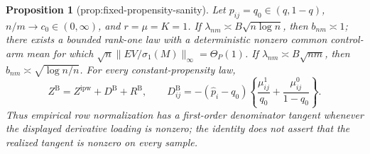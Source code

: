 \documentclass{article}
\newtheorem{proposition}{Proposition}
\begin{document}
\begin{proposition}[prop:fixed-propensity-sanity]\label{prop:fixed-propensity-sanity}
Let \(p_{ij}=q_0\in(q,1-q)\), \(n/m\to c_0\in(0,\infty)\), and \(r=\mu=K=1\).  If \(\lambda_{nm}\asymp B\sqrt{n\log n}\), then \(b_{nm}\asymp1\); there exists a bounded rank-one law with a deterministic nonzero common control-arm mean for which \(\sqrt n\lVert EV/\sigma_1(M)\rVert_\infty=\Theta_P(1)\).  If \(\lambda_{nm}\asymp B\sqrt{nm}\), then \(b_{nm}\asymp\sqrt{\log n/n}\).  For every constant-propensity law,
\[
 Z^{\mathrm B}=Z^{\mathrm{ipw}}+D^{\mathrm B}+R^{\mathrm B},\qquad
 D^{\mathrm B}_{ij}=-(\widehat p_i-q_0)
 \left\{\frac{\mu^1_{ij}}{q_0}+\frac{\mu^0_{ij}}{1-q_0}\right\}.
\]
Thus empirical row normalization has a first-order denominator tangent whenever the displayed derivative loading is nonzero; the identity does not assert that the realized tangent is nonzero on every sample.
\end{proposition}
\end{document}
